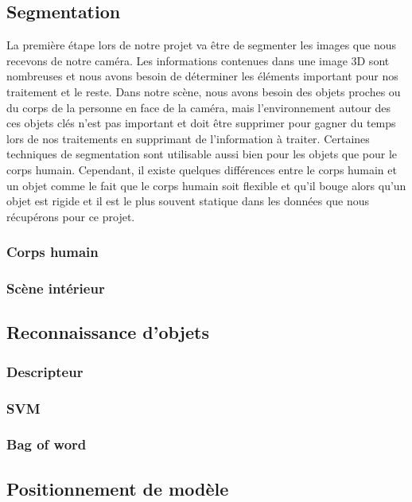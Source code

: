 \subsection{Segmentation}
La première étape lors de notre projet va être de segmenter les images que nous recevons de 
notre caméra. Les informations contenues dans une image 3D sont nombreuses et nous avons
besoin de déterminer les éléments important pour nos traitement et le reste. Dans notre scène,
nous avons besoin des objets proches ou du corps de la personne en face de la caméra, mais 
l'environnement autour des ces objets clés n'est pas important et doit être supprimer pour
gagner du temps lors de nos traitements en supprimant de l'information à traiter. Certaines
techniques de segmentation sont utilisable aussi bien pour les objets que pour le corps humain.
Cependant, il existe quelques différences entre le corps humain et un objet comme le fait que le
corps humain soit flexible et qu'il bouge alors qu'un objet est rigide et il est le plus souvent 
statique dans les données que nous récupérons pour ce projet.
 
\subsubsection{Corps humain}

\subsubsection{Scène intérieur}

\subsection{Reconnaissance d'objets}
\subsubsection{Descripteur}
\subsubsection{SVM} %
\subsubsection{Bag of word}

\subsection{Positionnement de modèle}
